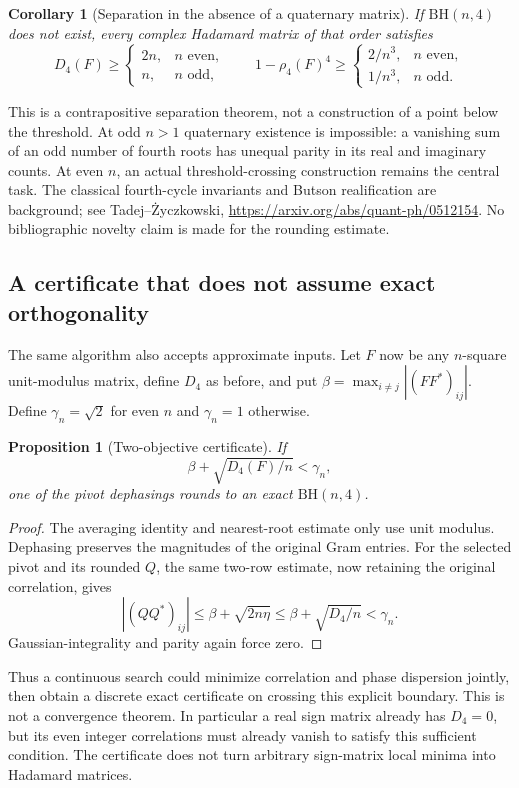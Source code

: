 \documentclass[11pt]{article}
\newtheorem{corollary}[theorem]{Corollary}
\newtheorem{proposition}[theorem]{Proposition}
\begin{document}
\begin{corollary}[Separation in the absence of a quaternary matrix]
If $\mathrm{BH}(n,4)$ does not exist, every complex Hadamard matrix
of that order satisfies
\[
 D_4(F)\ge
 \begin{cases}2n,&n\text{ even},\\n,&n\text{ odd},\end{cases}
 \qquad
 1-\rho_4(F)^4\ge
 \begin{cases}2/n^3,&n\text{ even},\\1/n^3,&n\text{ odd}.\end{cases}
\]
\end{corollary}
This is a contrapositive separation theorem, not a construction of a
point below the threshold. At odd $n>1$ quaternary existence is
impossible: a vanishing sum of an odd number of fourth roots has
unequal parity in its real and imaginary counts. At even $n$,
an actual threshold-crossing construction remains the central task.
The classical fourth-cycle invariants and Butson realification are
background; see Tadej--\.Zyczkowski,
\url{https://arxiv.org/abs/quant-ph/0512154}.
No bibliographic novelty claim is made for the rounding estimate.

\subsection{A certificate that does not assume exact orthogonality}
The same algorithm also accepts approximate inputs.
Let $F$ now be any $n$-square unit-modulus matrix, define $D_4$ as
before, and put $\beta=\max_{i\ne j}|(FF^*)_{ij}|$.
Define $\gamma_n=\sqrt2$ for even $n$ and $\gamma_n=1$ otherwise.
\begin{proposition}[Two-objective certificate]
If
\[
 \beta+\sqrt{D_4(F)/n}<\gamma_n,
\]
one of the pivot dephasings rounds to an exact $\mathrm{BH}(n,4)$.
\end{proposition}
\begin{proof}
The averaging identity and nearest-root estimate only use unit modulus.
Dephasing preserves the magnitudes of the original Gram entries.
For the selected pivot and its rounded $Q$, the same two-row
estimate, now retaining the original correlation, gives
\[
 |(QQ^*)_{ij}|\le\beta+\sqrt{2n\eta}
 \le\beta+\sqrt{D_4/n}<\gamma_n.
\]
Gaussian-integrality and parity again force zero.
\end{proof}
Thus a continuous search could minimize correlation and phase dispersion
jointly, then obtain a discrete exact certificate on crossing this
explicit boundary. This is not a convergence theorem. In particular a
real sign matrix already has $D_4=0$, but its even integer correlations
must already vanish to satisfy this sufficient condition. The certificate
does not turn arbitrary sign-matrix local minima into Hadamard matrices.
\end{document}
